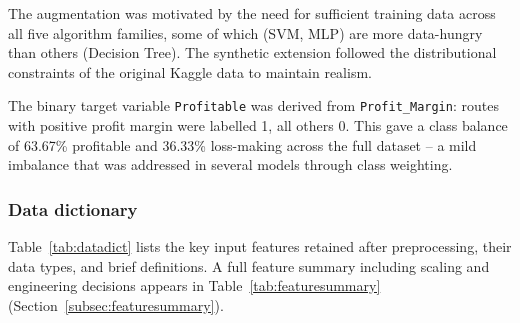 \documentclass[12pt,a4paper]{article}
\begin{document}
The augmentation was motivated by the need for sufficient training data across all five algorithm families, some of which (SVM, MLP) are more data-hungry than others (Decision Tree). The synthetic extension followed the distributional constraints of the original Kaggle data to maintain realism.

The binary target variable \texttt{Profitable} was derived from \texttt{Profit\_Margin}: routes with positive profit margin were labelled 1, all others 0. This gave a class balance of 63.67\% profitable and 36.33\% loss-making across the full dataset -- a mild imbalance that was addressed in several models through class weighting.

\subsubsection{Data dictionary}

Table~\ref{tab:datadict} lists the key input features retained after preprocessing, their data types, and brief definitions. A full feature summary including scaling and engineering decisions appears in Table~\ref{tab:featuresummary} (Section~\ref{subsec:featuresummary}).
\end{document}
